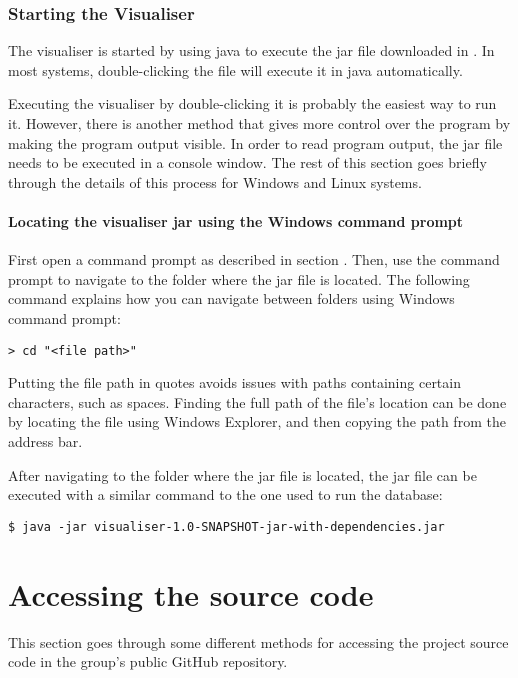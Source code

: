 \documentclass[../document.tex]{subfiles}
\begin{document}
\subsubsection{Starting the Visualiser}
The visualiser is started by using java to execute the jar file downloaded in . In most systems, double-clicking the file will execute it in java automatically.

Executing the visualiser by double-clicking it is probably the easiest way to run it. However, there is another method that gives more control over the program by making the program output visible. In order to read program output, the jar file needs to be executed in a console window. The rest of this section goes briefly through the details of this process for Windows and Linux systems.

\paragraph{Locating the visualiser jar using the Windows command prompt}
First open a command prompt as described in section . Then, use the command prompt to navigate to the folder where the jar file is located. The following command explains how you can navigate between folders using Windows command prompt:
\lstset{style=custombash}
\begin{lstlisting}[caption=Windows command to change current folder]
> cd "<file path>"
\end{lstlisting}
Putting the file path in quotes avoids issues with paths containing certain characters, such as spaces. Finding the full path of the file's location can be done by locating the file using Windows Explorer, and then copying the path from the address bar.

After navigating to the folder where the jar file is located, the jar file can be executed with a similar command to the one used to run the database:
\begin{lstlisting}[caption=Command to execute the visualiser in Java.]
$ java -jar visualiser-1.0-SNAPSHOT-jar-with-dependencies.jar
\end{lstlisting}



\section{Accessing the source code}
This section goes through some different methods for accessing the project source code in the group's public GitHub repository.
\end{document}
